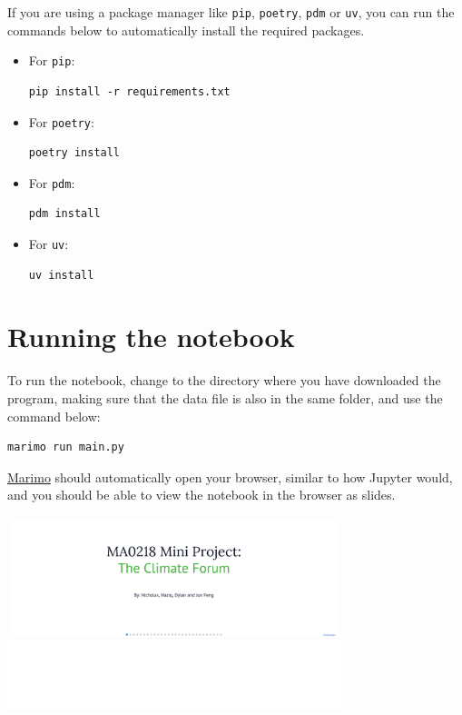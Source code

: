 \documentclass[11pt]{article}
\begin{document}
If you are using a package manager like \texttt{pip}, \texttt{poetry}, \texttt{pdm} or \texttt{uv},
you can run the commands below to automatically install
the required packages.

\begin{itemize}
\item For \texttt{pip}:

\begin{verbatim}
pip install -r requirements.txt
\end{verbatim}

\item For \texttt{poetry}:

\begin{verbatim}
poetry install
\end{verbatim}

\item For \texttt{pdm}:

\begin{verbatim}
pdm install
\end{verbatim}

\item For \texttt{uv}:

\begin{verbatim}
uv install
\end{verbatim}
\end{itemize}

\newpage
\section{Running the notebook}
\label{sec:org56bfbb0}
To run the notebook, change to the directory
where you have downloaded the program,
making sure that the data file is also
in the same folder, and use the command below:
\begin{verbatim}
marimo run main.py
\end{verbatim}

\href{https://marimo.io/}{Marimo} should automatically open your browser,
similar to how Jupyter would, and you should be
able to view the notebook in the browser as slides.

\begin{center}
\includegraphics[height=15em]{./images/result-of-running-the-notebook.png}
\end{center}
\end{document}
